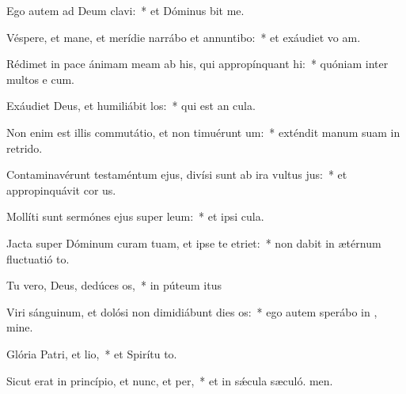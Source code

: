 \item Ego autem ad Deum clavi:~* et Dóminus bit me.
\item Véspere, et mane, et merídie narrábo et annuntibo:~* et exáudiet vo am.
\item Rédimet in pace ánimam meam ab his, qui appropínquant hi:~* quóniam inter multos e cum.
\item Exáudiet Deus, et humiliábit los:~* qui est an cula.
\item Non enim est illis commutátio, et non timuérunt um:~* exténdit manum suam in retrido.
\item Contaminavérunt testaméntum ejus, divísi sunt ab ira vultus jus:~* et appropinquávit cor us.
\item Mollíti sunt sermónes ejus super leum:~* et ipsi  cula.
\item Jacta super Dóminum curam tuam, et ipse te etriet:~* non dabit in ætérnum fluctuatió to.
\item Tu vero, Deus, dedúces os,~* in púteum itus
\item Viri sánguinum, et dolósi non dimidiábunt dies os:~* ego autem sperábo in , mine.
\item Glória Patri, et lio,~* et Spirítu to.
\item Sicut erat in princípio, et nunc, et per,~* et in sǽcula sæculó. men.
